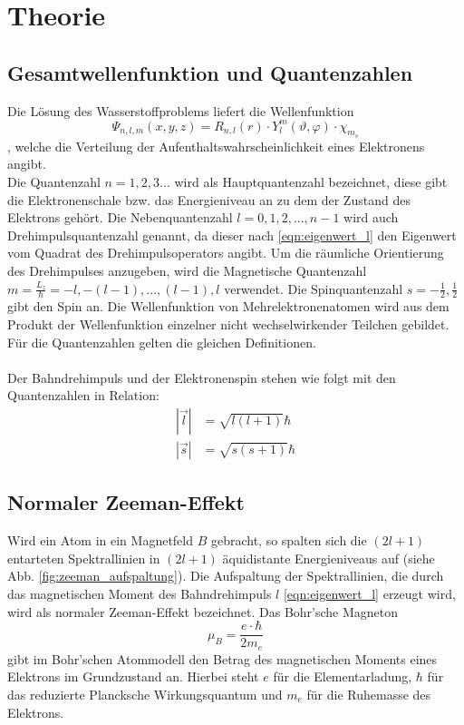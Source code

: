 \section{Theorie}
\label{sec:Theorie}

\subsection{Gesamtwellenfunktion und Quantenzahlen}
Die Lösung des Wasserstoffproblems liefert die Wellenfunktion
\begin{equation*}
    \Psi_{n, l, m} (x, y, z) = R_{n, l}(r) \cdot Y_l^m (\vartheta, \varphi) \cdot \chi_{m_s}
\end{equation*}
, welche die Verteilung der Aufenthaltswahrscheinlichkeit eines Elektronens angibt.\\
Die Quantenzahl $n = 1, 2, 3 ...$ wird als Hauptquantenzahl bezeichnet, diese gibt die Elektronenschale bzw. das Energieniveau an zu dem der Zustand des Elektrons gehört.
Die Nebenquantenzahl $l = 0, 1, 2, ..., n-1 $ wird auch Drehimpulsquantenzahl genannt, da dieser nach \autoref{eqn:eigenwert_l} den Eigenwert vom Quadrat des Drehimpulsoperators angibt. 
Um die räumliche Orientierung des Drehimpulses anzugeben, wird die Magnetische Quantenzahl $m = \frac{L_z}{\hbar} = -l, - (l-1), ..., (l-1), l$ verwendet.
Die Spinquantenzahl $s = -\frac{1}{2} , \frac{1}{2}$ gibt den Spin an.
Die Wellenfunktion von Mehrelektronenatomen wird aus dem Produkt der Wellenfunktion einzelner nicht wechselwirkender Teilchen gebildet.
Für die Quantenzahlen gelten die gleichen Definitionen.
\\ \\
Der Bahndrehimpuls und der Elektronenspin stehen wie folgt mit den Quantenzahlen in Relation:
\begin{align}
    |\vec{l}| &= \sqrt{l(l+1)} \hbar \label{eqn:eigenwert_l} \\
    |\vec{s}| &= \sqrt{s(s+1)} \hbar \label{eqn:eigenwert_s}
\end{align}
\FloatBarrier

\subsection{Normaler Zeeman-Effekt}
Wird ein Atom in ein Magnetfeld $B$ gebracht, so spalten sich die $(2l + 1)$ entarteten Spektrallinien in $(2l + 1)$ äquidistante Energieniveaus auf (siehe Abb. \ref{fig:zeeman_aufspaltung}).
Die Aufspaltung der Spektrallinien, die durch das magnetischen Moment des Bahndrehimpuls $l$ \eqref{eqn:eigenwert_l} erzeugt wird, wird als normaler Zeeman-Effekt bezeichnet.
Das Bohr'sche Magneton
\begin{equation}
    \mu_B = \frac{e \cdot \hbar}{2 m_e}
    \label{eqn:magneton}
\end{equation}
gibt im Bohr'schen Atommodell den Betrag des magnetischen Moments eines Elektrons im Grundzustand an.
Hierbei steht $e$ für die Elementarladung, $\hbar$ für das reduzierte Plancksche Wirkungsquantum und $m_e$ für die Ruhemasse des Elektrons.

